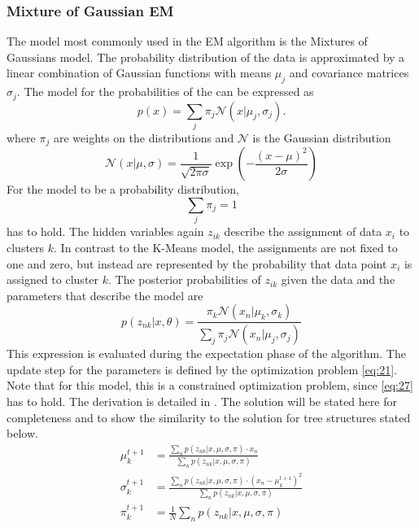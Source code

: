 \subsubsection{Mixture of Gaussian EM}
\label{sec:mixture-gaussian-em}
The model most commonly used in the EM algorithm is the Mixtures of Gaussians model.
The probability distribution of the data is approximated by a linear combination of Gaussian functions with means $\mu_j$ and covariance matrices $\sigma_j$.
The model for the probabilities of the can be expressed as
\begin{equation}
  \label{eq:22}
  p(x) = \sum_{j}\pi_j\mathcal{N}(x|\mu_j,\sigma_j). 
\end{equation}
where $\pi_j$ are weights on the distributions and $\mathcal{N}$ is the Gaussian distribution
\begin{equation}
  \label{eq:25}
  \mathcal{N}(x|\mu,\sigma) = \frac{1}{\sqrt{2\pi\sigma}}\exp\left(-\frac{(x-\mu)^2}{2\sigma}\right)
\end{equation}
For the model to be a probability distribution,
\begin{equation}
  \label{eq:27}
  \sum_j\pi_j = 1
\end{equation}
has to hold.
The hidden variables again $z_{ik}$ describe the  assignment of data $x_i$ to clusters $k$.
In contrast to the K-Means model, the assignments are not fixed to one and zero, but instead are represented by the probability that data point $x_i$ is assigned to cluster $k$.
The posterior probabilities of $z_{ik}$ given the data and the parameters that describe the model are 
\begin{equation}
  \label{eq:26}
  p(z_{nk}|x, \theta) = \frac{\pi_k\mathcal{N}(x_n|\mu_k,\sigma_k)}{\sum_j\pi_j\mathcal{N}(x_n|\mu_j, \sigma_j)}
\end{equation}
This expression is evaluated during the expectation phase of the algorithm.
The update step for the parameters is defined by the optimization problem \eqref{eq:21}.
Note that for this model, this is a constrained optimization problem, since \eqref{eq:27} has to hold.
The derivation is detailed in \cite{Bishop2006}.
The solution will be stated here for completeness and to show the similarity to the solution for tree structures stated below.
\begin{align}
  \label{eq:29}
  \mu_k^{t+1} &= \frac{\sum_np(z_{nk}|x, \mu, \sigma, \pi)\cdot x_n}{\sum_np(z_{nk}|x, \mu, \sigma, \pi)}\\
  \sigma_k^{t+1}&= \frac{\sum_np(z_{nk}|x, \mu, \sigma, \pi)\cdot (x_n-\mu_k^{t+1})^2}{\sum_np(z_{nk}|x, \mu, \sigma, \pi)}\\
  \pi_k^{t+1}&= \frac{1}{N}\sum_{n}p(z_{nk}|x, \mu, \sigma, \pi)
\end{align}

